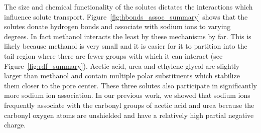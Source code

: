 \documentclass[journal=jpcbfk,manuscript=article]{achemso}
\begin{document}
  The size and chemical functionality of the solutes dictates the interactions which
  influence solute transport. Figure~\ref{fig:hbonds_assoc_summary} shows that the
  solutes donate hydrogen bonds and associate with sodium ions to varying degrees.
  In fact methanol interacts the least by these mechanisms by far. This is likely 
  because methanol is very small and it is easier for it to partition into the tail
  region where there are fewer groups with which it can interact (see Figure~\ref{fig:rdf_summary}).
  Acetic acid, urea and ethylene glycol are slightly larger than methanol and contain 
  multiple polar substituents which stabilize them closer to the pore center.
  These three solutes also participate in significantly more sodium ion association. 
  In our previous work, we showed that sodium ions frequently associate with the 
  carbonyl groups of acetic acid and urea because the carbonyl oxygen atoms are
  unshielded and have a relatively high partial negative charge.~\cite{coscia_chemically_2019}
  
\end{document}
